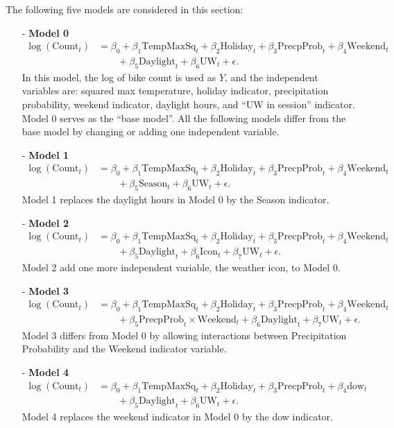 \documentclass [11pt, proquest] {uwthesis}[2015/03/03]
\begin{document}
The following five models are considered in this section:
\begin{enumerate}
\item[-] \textbf{Model 0}
\begin{align}
\log(\text{Count}_t) &= \beta_0 + \beta_1 \text{TempMaxSq}_t + \beta_2 \text{Holiday}_t + \beta_3 \text{PrecpProb}_t + \beta_4 \text{Weekend}_t \nonumber\\
&\qquad + \beta_5 \text{Daylight}_t + \beta_6 \text{UW}_t + \epsilon.\label{eqref:model0}
\end{align}
In this model, the log of bike count is used as $Y$, and the independent variables are: squared max temperature, holiday indicator, precipitation probability, weekend indicator, daylight hours, and ``UW in session'' indicator. Model 0 serves as the ``base model''. All the following models differ from the base model by changing or adding one independent variable. 
\item[-] \textbf{Model 1}
\begin{align}
\log(\text{Count}_t) &= \beta_0 + \beta_1 \text{TempMaxSq}_t + \beta_2 \text{Holiday}_t + \beta_3 \text{PrecpProb}_t + \beta_4 \text{Weekend}_t \nonumber\\
&\qquad + \beta_5 \text{Season}_t + \beta_6 \text{UW}_t + \epsilon.\label{eqref:model1}
\end{align}
Model 1 replaces the daylight hours in Model 0 by the Season indicator.
\item[-] \textbf{Model 2}
\begin{align}
\log(\text{Count}_t) &= \beta_0 + \beta_1 \text{TempMaxSq}_t + \beta_2 \text{Holiday}_t + \beta_3 \text{PrecpProb}_t + \beta_4 \text{Weekend}_t \nonumber\\
&\qquad+ \beta_5 \text{Daylight}_t + \beta_6 \text{Icon}_t + \beta_7 \text{UW}_t + \epsilon.\label{eqref:model2}
\end{align}
Model 2 add one more independent variable, the weather icon, to Model 0.
\item[-] \textbf{Model 3}
\begin{align}
\log(\text{Count}_t) &= \beta_0 + \beta_1 \text{TempMaxSq}_t + \beta_2 \text{Holiday}_t + \beta_3 \text{PrecpProb}_t +\beta_4 \text{Weekend}_t  \nonumber\\
&\qquad + \beta_5 \text{PrecpProb}_t \times \text{Weekend}_t + \beta_6 \text{Daylight}_t + \beta_7 \text{UW}_t + \epsilon. \label{eqref:model3}
\end{align}
Model 3 differs from Model 0 by allowing interactions between Precipitation Probability and the Weekend indicator variable.
\item[-] \textbf{Model 4}
\begin{align}
\log(\text{Count}_t) &= \beta_0 + \beta_1 \text{TempMaxSq}_t + \beta_2 \text{Holiday}_t + \beta_3 \text{PrecpProb}_t + \beta_4 \text{dow}_t \nonumber\\
&\qquad + \beta_5 \text{Daylight}_t + \beta_6 \text{UW}_t + \epsilon.\label{eqref:model4}
\end{align}
Model 4 replaces the weekend indicator in Model 0 by the dow indicator. 
\end{enumerate}
\end{document}
